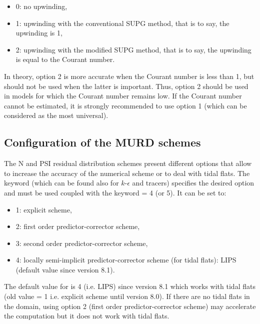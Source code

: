 \begin{itemize}
\item 0: no upwinding,

\item 1: upwinding with the conventional SUPG method, that is to say, the
upwinding is 1,

\item 2: upwinding with the modified SUPG method, that is to say, the
upwinding is equal to the Courant number.
\end{itemize}

In theory, option 2 is more accurate when the Courant number is less than 1,
but should not be used when the latter is important. Thus, option 2 should be
used in models for which the Courant number remains low. If the Courant number
cannot be estimated, it is strongly recommended to use option 1 (which can be
considered as the most universal).

\subsection{Configuration of the MURD schemes}
\label{sec:MURD}
The N and PSI residual distribution schemes present different options that allow
to increase the accuracy of the numerical scheme or to deal with tidal flats.
The keyword  (which can be
found also for $k$-$\epsilon$ and tracers) specifies the desired option and must
be used coupled with the keyword
 = 4 (or 5).
It can be set to:
\begin{itemize}
 \item 1: explicit scheme,
 \item 2: first order predictor-corrector scheme,
 \item 3: second order predictor-corrector scheme,
 \item 4: locally semi-implicit predictor-corrector scheme
(for tidal flats): LIPS (default value since version 8.1).
\end{itemize}
The default value for  is
4 (i.e. LIPS) since version 8.1 which works with tidal flats (old value = 1
i.e. explicit scheme until version 8.0).
If there are no tidal flats in the domain, using option 2 (first order
predictor-corrector scheme) may accelerate the computation but it does not
work with tidal flats.

